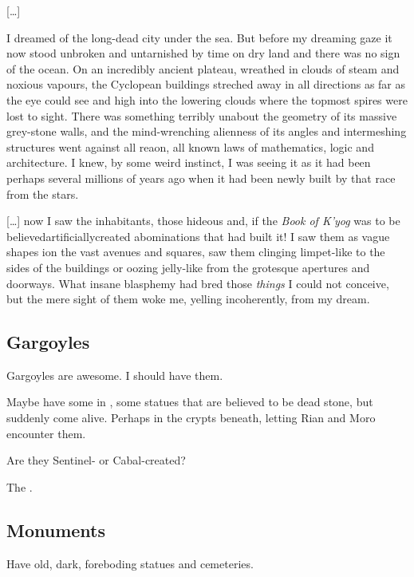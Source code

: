 {  [\ldots{}]
  
  I dreamed of the long-dead city under the sea.
  But before my dreaming gaze it now stood unbroken and untarnished by time on dry land and there was no sign of the ocean.
  On an incredibly ancient plateau, wreathed in clouds of steam and noxious vapours, the Cyclopean buildings streched away in all directions as far as the eye could see and high into the lowering clouds where the topmost spires were lost to sight.
  There was something terribly un\human about the geometry of its massive grey-stone walls, and the mind-wrenching alienness of its angles and intermeshing structures went against all reaon, all known laws of mathematics, logic and architecture.
  I knew, by some weird instinct, I was seeing it as it had been perhaps several millions of years ago when it had been newly built by that race from the stars. 
  
  [\ldots{}] now I saw the inhabitants, those hideous and, if the \emph{Book of K'yog} was to be believed\dash{}artificially\dash{}created abominations that had built it!
  I saw them as vague shapes ion the vast avenues and squares, saw them clinging limpet-like to the sides of the buildings or oozing jelly-like from the grotesque apertures and doorways.
  What insane blasphemy had bred those \emph{things} I could not conceive, but the mere sight of them woke me, yelling incoherently, from my dream. 
}






\subsection{Gargoyles}
Gargoyles are awesome. 
I should have them. 

Maybe have some in \Malcur, some statues that are believed to be dead stone, but suddenly come alive. Perhaps in the crypts beneath, letting Rian and Moro encounter them. 

Are they Sentinel- or Cabal-created?

The . 









\subsection{Monuments}
Have old, dark, foreboding statues and cemeteries.

